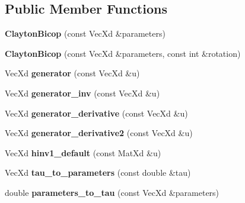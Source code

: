 \subsection*{Public Member Functions}
\begin{DoxyCompactItemize}
\item 
{\bfseries Clayton\+Bicop} (const Vec\+Xd \&parameters)\hypertarget{class_clayton_bicop_a40ae835970aa67c3aacea800a831cc52}{}\label{class_clayton_bicop_a40ae835970aa67c3aacea800a831cc52}

\item 
{\bfseries Clayton\+Bicop} (const Vec\+Xd \&parameters, const int \&rotation)\hypertarget{class_clayton_bicop_a7b28e2ac34943f2b69616efffedcf720}{}\label{class_clayton_bicop_a7b28e2ac34943f2b69616efffedcf720}

\item 
Vec\+Xd {\bfseries generator} (const Vec\+Xd \&u)\hypertarget{class_clayton_bicop_a9763aabca37806261b8ecd6c46f4cf95}{}\label{class_clayton_bicop_a9763aabca37806261b8ecd6c46f4cf95}

\item 
Vec\+Xd {\bfseries generator\+\_\+inv} (const Vec\+Xd \&u)\hypertarget{class_clayton_bicop_a295caa6493575640a96201414dbf398f}{}\label{class_clayton_bicop_a295caa6493575640a96201414dbf398f}

\item 
Vec\+Xd {\bfseries generator\+\_\+derivative} (const Vec\+Xd \&u)\hypertarget{class_clayton_bicop_ab009f6aa6036ad92d83a3d185e6234d8}{}\label{class_clayton_bicop_ab009f6aa6036ad92d83a3d185e6234d8}

\item 
Vec\+Xd {\bfseries generator\+\_\+derivative2} (const Vec\+Xd \&u)\hypertarget{class_clayton_bicop_af24c631fbf12bcf3f52724fcf926cfef}{}\label{class_clayton_bicop_af24c631fbf12bcf3f52724fcf926cfef}

\item 
Vec\+Xd {\bfseries hinv1\+\_\+default} (const Mat\+Xd \&u)\hypertarget{class_clayton_bicop_a54ee65a9403fab88aa713f50c57971b7}{}\label{class_clayton_bicop_a54ee65a9403fab88aa713f50c57971b7}

\item 
Vec\+Xd {\bfseries tau\+\_\+to\+\_\+parameters} (const double \&tau)\hypertarget{class_clayton_bicop_a7ffb38cb5802a8d4d45f401ac5aab83b}{}\label{class_clayton_bicop_a7ffb38cb5802a8d4d45f401ac5aab83b}

\item 
double {\bfseries parameters\+\_\+to\+\_\+tau} (const Vec\+Xd \&parameters)\hypertarget{class_clayton_bicop_a5eba5ab351ad17df7d633c7c96f6cbdf}{}\label{class_clayton_bicop_a5eba5ab351ad17df7d633c7c96f6cbdf}

\end{DoxyCompactItemize}
